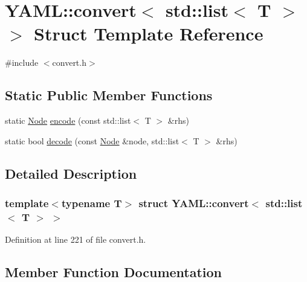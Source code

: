 \hypertarget{struct_y_a_m_l_1_1convert_3_01std_1_1list_3_01_t_01_4_01_4}{}\section{Y\+A\+ML\+::convert$<$ std\+::list$<$ T $>$ $>$ Struct Template Reference}
\label{struct_y_a_m_l_1_1convert_3_01std_1_1list_3_01_t_01_4_01_4}


{\ttfamily \#include $<$convert.\+h$>$}

\subsection*{Static Public Member Functions}
\begin{DoxyCompactItemize}
\item 
static \mbox{\hyperlink{class_y_a_m_l_1_1_node}{Node}} \mbox{\hyperlink{struct_y_a_m_l_1_1convert_3_01std_1_1list_3_01_t_01_4_01_4_ad1860762a3b4c19b04cacca6061ae79e}{encode}} (const std\+::list$<$ T $>$ \&rhs)
\item 
static bool \mbox{\hyperlink{struct_y_a_m_l_1_1convert_3_01std_1_1list_3_01_t_01_4_01_4_a913e5a6b531e0bb0f9a8f0bacf3e82bd}{decode}} (const \mbox{\hyperlink{class_y_a_m_l_1_1_node}{Node}} \&node, std\+::list$<$ T $>$ \&rhs)
\end{DoxyCompactItemize}


\subsection{Detailed Description}
\subsubsection*{template$<$typename T$>$\newline
struct Y\+A\+M\+L\+::convert$<$ std\+::list$<$ T $>$ $>$}



Definition at line 221 of file convert.\+h.



\subsection{Member Function Documentation}
\mbox{\label{struct_y_a_m_l_1_1convert_3_01std_1_1list_3_01_t_01_4_01_4_a913e5a6b531e0bb0f9a8f0bacf3e82bd}} 

